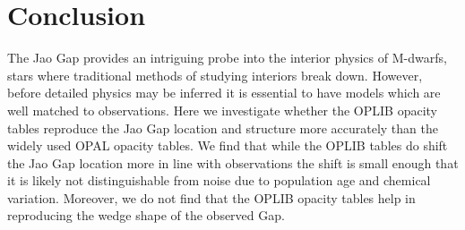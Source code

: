 \section{Conclusion}\label{sec:conclusion}
The Jao Gap provides an intriguing probe into the interior physics of M-dwarfs,
stars where traditional methods of studying interiors break down. However,
before detailed physics may be inferred it is essential to have models which
are well matched to observations. Here we investigate whether the OPLIB opacity
tables reproduce the Jao Gap location and structure more accurately than the
widely used OPAL opacity tables. We find that while the OPLIB tables do shift
the Jao Gap location more in line with observations the shift is small enough
that it is likely not distinguishable from noise due to population age and
chemical variation. Moreover, we do not find that the OPLIB opacity tables help
in reproducing the wedge shape of the observed Gap.

